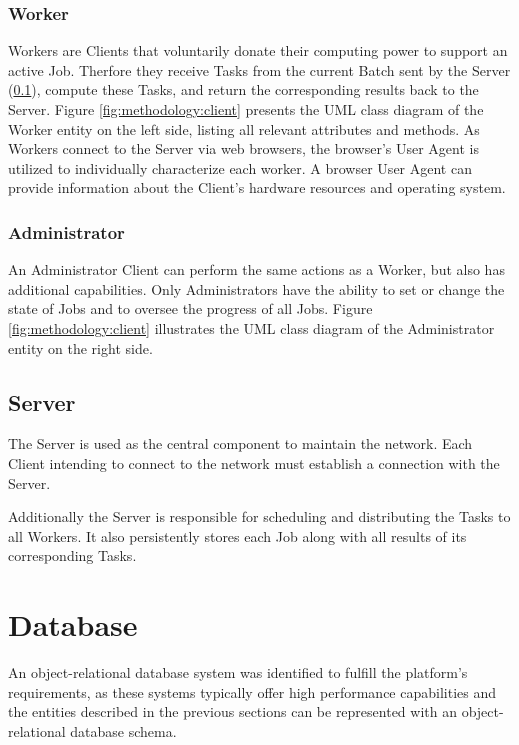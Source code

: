 \subsubsection{Worker}
\label{ssubsec:methodology:entities:client:worker}
Workers are Clients that voluntarily donate their computing power to support an active Job. Therfore they receive Tasks from the current Batch sent by the Server (\ref{subsec:methodology:entities:Server}), compute these Tasks, and return the corresponding results back to the Server. Figure \ref{fig:methodology:client} presents the \ac{UML} class diagram of the Worker entity on the left side, listing all relevant attributes and methods. As Workers connect to the Server via web browsers, the browser's User Agent is utilized to individually characterize each worker. A browser User Agent can provide information about the Client's hardware resources and operating system.

\subsubsection{Administrator}
\label{ssubsec:methodology:entities:client:admin}
An Administrator Client can perform the same actions as a Worker, but also has additional capabilities. Only Administrators have the ability to set or change the state of Jobs and to oversee the progress of all Jobs. Figure \ref{fig:methodology:client} illustrates the \ac{UML} class diagram of the Administrator entity on the right side.

\subsection{Server}
\label{subsec:methodology:entities:Server}
The Server is used as the central component to maintain the network. Each Client intending to connect to the network must establish a connection with the Server.

Additionally the Server is responsible for scheduling and distributing the Tasks to all Workers. It also persistently stores each Job along with all results of its corresponding Tasks.

\section{Database}
An object-relational database system was identified to fulfill the platform's requirements, as these systems typically offer high performance capabilities and the entities described in the previous sections can be represented with an object-relational database schema.

